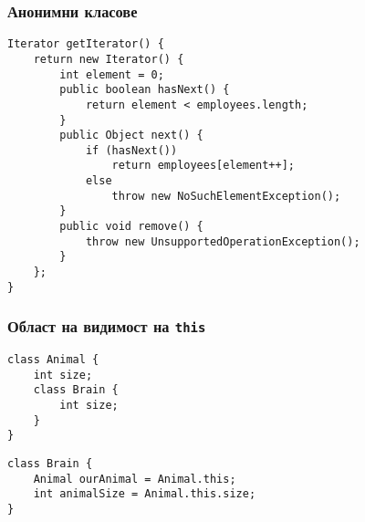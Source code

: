 \documentclass[ignorenonframetext, hyperref=unicode,compress,pdflatex]{beamer}
\begin{document}
\begin{frame}[containsverbatim]\frametitle{Анонимни класове}
\begin{lstlisting}
Iterator getIterator() {
	return new Iterator() {
		int element = 0;
		public boolean hasNext() {
			return element < employees.length;
		}
		public Object next() {
			if (hasNext())
				return employees[element++];
			else
				throw new NoSuchElementException();
		}
		public void remove() {
			throw new UnsupportedOperationException();
		}
	};
}
\end{lstlisting}
\end{frame}

\begin{frame}[containsverbatim]\frametitle{Област на видимост на \lstinline{this}}
\begin{lstlisting}
class Animal {
	int size;
	class Brain {
		int size;
	}
}
\end{lstlisting}
\begin{lstlisting}
class Brain {
	Animal ourAnimal = Animal.this;
	int animalSize = Animal.this.size;
}
\end{lstlisting}
\end{frame}
\end{document}
